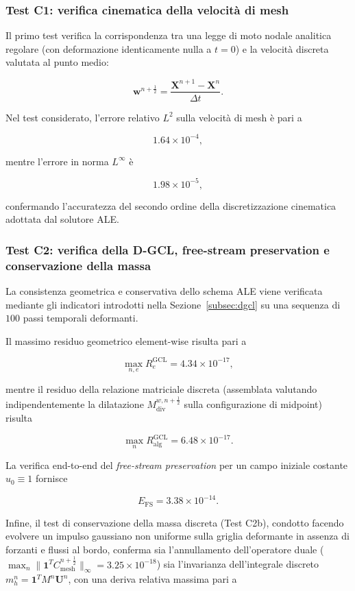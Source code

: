 \subsubsection{Test C1: verifica cinematica della velocità di mesh}

\label{subsubsec:c1}

Il primo test verifica la corrispondenza tra una legge di moto nodale analitica regolare (con deformazione identicamente nulla a $t=0$) e la velocità discreta valutata al punto medio:

\[
\mathbf{w}^{n+\frac12}
=
\frac{\mathbf{X}^{n+1}-\mathbf{X}^{n}}{\Delta t}.
\]

Nel test considerato, l'errore relativo $L^2$ sulla velocità di mesh è pari a

\[
1.64\times10^{-4},
\]

mentre l'errore in norma $L^\infty$ è

\[
1.98\times10^{-5},
\]

confermando l'accuratezza del secondo ordine della discretizzazione cinematica adottata dal solutore ALE.

\subsubsection{Test C2: verifica della D-GCL, free-stream preservation e conservazione della massa}

\label{subsubsec:c2}

La consistenza geometrica e conservativa dello schema ALE viene verificata mediante gli indicatori introdotti nella Sezione~\ref{subsec:dgcl} su una sequenza di $100$ passi temporali deformanti.

Il massimo residuo geometrico element-wise risulta pari a

\[
\max_{n,e}R_e^{\mathrm{GCL}}
=
4.34\times10^{-17},
\]

mentre il residuo della relazione matriciale discreta (assemblata valutando indipendentemente la dilatazione $M_{\mathrm{div}}^{w,n+\frac12}$ sulla configurazione di midpoint) risulta

\[
\max_n
R_{\mathrm{alg}}^{\mathrm{GCL}}
=
6.48\times10^{-17}.
\]

La verifica end-to-end del \textit{free-stream preservation} per un campo iniziale costante $u_0\equiv1$ fornisce

\[
E_{\mathrm{FS}}
=
3.38\times10^{-14}.
\]

Infine, il test di conservazione della massa discreta (Test C2b), condotto facendo evolvere un impulso gaussiano non uniforme sulla griglia deformante in assenza di forzanti e flussi al bordo, conferma sia l'annullamento dell'operatore duale ($\max_n \|\mathbf{1}^T C_{\mathrm{mesh}}^{n+\frac12}\|_\infty = 3.25\times10^{-18}$) sia l'invarianza dell'integrale discreto $m_h^n = \mathbf{1}^T M^n\mathbf{U}^n$, con una deriva relativa massima pari a

